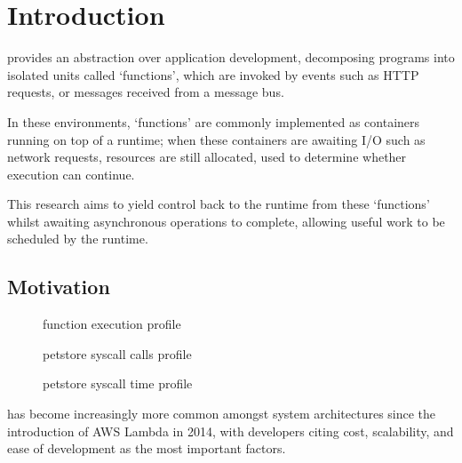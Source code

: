 \chapter{Introduction}

\faasxlong{} provides an abstraction over application development, decomposing programs into isolated units called `functions', which are invoked by events such as HTTP requests, or messages received from a message bus.

In these environments, `functions' are commonly implemented as containers running on top of a runtime; when these containers are awaiting I/O such as network requests, resources are still allocated, used to determine whether execution can continue.

This research aims to yield control back to the runtime from these `functions' whilst awaiting asynchronous operations to complete, allowing useful work to be scheduled by the runtime.

\section{Motivation}
\begin{figure}
    \begin{center}
        
    \end{center}
    \caption{\faas{} function execution profile}
\end{figure}

\begin{figure}
    \begin{center}
        
    \end{center}
    \caption{\faas{} petstore syscall calls profile}
\end{figure}

\begin{figure}
    \begin{center}
        
    \end{center}
    \caption{\faas{} petstore syscall time profile}
\end{figure}

\faaslong{} has become increasingly more common amongst system architectures since the introduction of AWS Lambda\cite{aws-lambda} in 2014, with developers citing cost, scalability, and ease of development as the most important factors\cite{review-of-serverless-use-cases-and-characteristics}.

